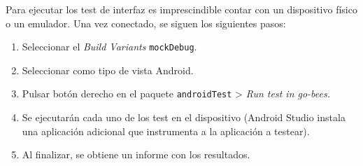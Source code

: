 Para ejecutar los test de interfaz es imprescindible contar con un
dispositivo físico o un emulador. Una vez conectado, se siguen los
siguientes pasos:

\begin{enumerate}
\def\labelenumi{\arabic{enumi}.}
\tightlist
\item
  Seleccionar el \emph{Build Variants} \texttt{mockDebug}.
\item
  Seleccionar como tipo de vista Android.
\item
  Pulsar botón derecho en el paquete \texttt{androidTest} \textgreater{}
  \emph{Run test in go-bees.}
\item
  Se ejecutarán cada uno de los test en el dispositivo (Android Studio
  instala una aplicación adicional que instrumenta a la aplicación a
  testear).
\item
  Al finalizar, se obtiene un informe con los resultados.
\end{enumerate}
